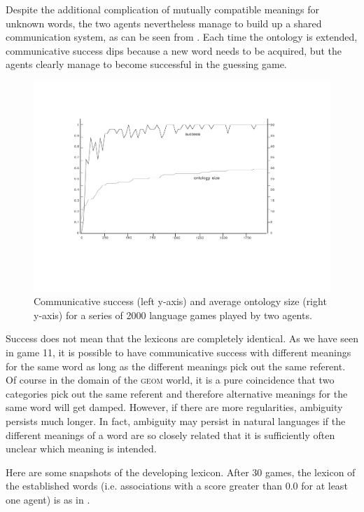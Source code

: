 Despite the additional complication of mutually 
compatible meanings for unknown words, the two agents
nevertheless manage to 
build up a shared communication system, as can be seen 
from . Each time the ontology is 
extended, communicative success dips because a new 
word needs to be acquired, but the agents clearly 
manage to become successful in the guessing game. 



\begin{figure}[htbp]
  \centerline{\includegraphics[width=\textwidth]{chap6/figs/gsucc3.pdf}}
\caption{\label{gsucc3}Communicative 
success (left y-axis) and average ontology size 
(right y-axis) for a series of 2000
language games played by two agents.} 
\end{figure}
Success does not mean that the lexicons are completely 
identical. As we have seen in game 11, it is possible
to have communicative success with different 
meanings for the same word as long as the different meanings
pick out the same referent. Of course in the domain of
the \textsc{geom} world, it is a pure coincidence that two categories
pick out the same referent and therefore alternative 
meanings for the same word will get damped. However, if there
are more regularities, ambiguity persists much longer. 
In fact, ambiguity may persist in natural languages if 
the different meanings of a word are so 
closely related that it is sufficiently often unclear
which meaning is intended. 

Here are some snapshots of the developing lexicon. 
After 30 games, the lexicon of the established
words (i.e. associations with a score greater 
than 0.0 for at least one agent) is as in . 




